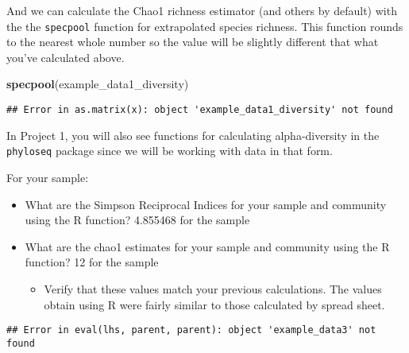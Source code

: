 \documentclass[]{article}
\newenvironment{Shaded}{\begin{snugshade}}{\end{snugshade}}
\newcommand{\KeywordTok}[1]{\textcolor[rgb]{0.13,0.29,0.53}{\textbf{#1}}}
\newcommand{\StringTok}[1]{\textcolor[rgb]{0.31,0.60,0.02}{#1}}
\newcommand{\OperatorTok}[1]{\textcolor[rgb]{0.81,0.36,0.00}{\textbf{#1}}}
\newcommand{\NormalTok}[1]{#1}
\providecommand{\tightlist}{%
  \setlength{\itemsep}{0pt}\setlength{\parskip}{0pt}}
\begin{document}
And we can calculate the Chao1 richness estimator (and others by
default) with the the \texttt{specpool} function for extrapolated
species richness. This function rounds to the nearest whole number so
the value will be slightly different that what you've calculated above.

\begin{Shaded}
\begin{Highlighting}[]
\KeywordTok{specpool}\NormalTok{(example_data1_diversity)}
\end{Highlighting}
\end{Shaded}

\begin{verbatim}
## Error in as.matrix(x): object 'example_data1_diversity' not found
\end{verbatim}

In Project 1, you will also see functions for calculating
alpha-diversity in the \texttt{phyloseq} package since we will be
working with data in that form.

For your sample:

\begin{itemize}
\tightlist
\item
  What are the Simpson Reciprocal Indices for your sample and community
  using the R function? 4.855468 for the sample
\item
  What are the chao1 estimates for your sample and community using the R
  function? 12 for the sample

  \begin{itemize}
  \tightlist
  \item
    Verify that these values match your previous calculations. The
    values obtain using R were fairly similar to those calculated by
    spread sheet.
  \end{itemize}
\end{itemize}

\begin{Shaded}
\end{Shaded}

\begin{verbatim}
## Error in eval(lhs, parent, parent): object 'example_data3' not found
\end{verbatim}
\end{document}
